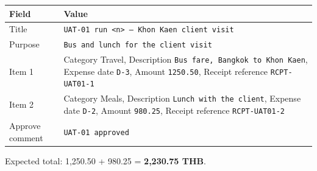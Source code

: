 {\def\LTcaptype{none} %
\begin{longtable}[]{@{}
  >{\raggedright\arraybackslash}p{}
  >{\raggedright\arraybackslash}p{}@{}}
\toprule\noalign{}
\begin{minipage}[b]{\linewidth}\raggedright
Field
\end{minipage} & \begin{minipage}[b]{\linewidth}\raggedright
Value
\end{minipage} \\
\midrule\noalign{}
\endhead
\bottomrule\noalign{}
\endlastfoot
Title & \texttt{UAT-01\ run\ \textless{}n\textgreater{}\ –\ Khon\ Kaen\ client\ visit} \\
Purpose & \texttt{Bus and lunch for the client visit} \\
Item 1 & Category Travel, Description \texttt{Bus fare, Bangkok to Khon Kaen}, Expense date \texttt{D-3}, Amount \texttt{1250.50}, Receipt reference \texttt{RCPT-UAT01-1} \\
Item 2 & Category Meals, Description \texttt{Lunch with the client}, Expense date \texttt{D-2}, Amount \texttt{980.25}, Receipt reference \texttt{RCPT-UAT01-2} \\
Approve comment & \texttt{UAT-01 approved} \\
\end{longtable}
}

Expected total: 1,250.50 + 980.25 = \textbf{2,230.75 THB}.

